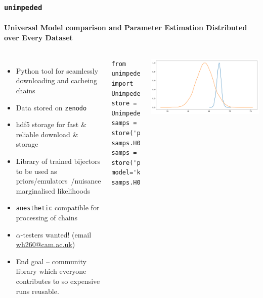 \documentclass[aspectratio=169]{beamer}
\begin{document}
\begin{frame}[fragile]
    \frametitle{\texttt{unimpeded}}
    \framesubtitle{Universal Model comparison and Parameter Estimation Distributed over Every Dataset}
    \begin{columns}
    \begin{itemize}
        \item Python tool for seamlessly downloading and cacheing chains
        \item Data stored on \texttt{zenodo} 
        \item hdf5 storage for fast \& reliable download \& storage
        \item Library of trained bijectors to be used as priors/emulators~/nuisance marginalised likelihoods~
        \item \texttt{anesthetic} compatible for processing of chains~
        \item $\alpha$-testers wanted! (email \href{mailto:wh260@cam.ac.uk}{wh260@cam.ac.uk}) 
        \item End goal -- community library which everyone contributes to so expensive runs reusable.
    \end{itemize}


\lstset{language=Python}
\lstset{frame=lines}
\lstset{basicstyle=\footnotesize}
\begin{lstlisting}
from unimpeded import Unimpeded
store = Unimpeded(cache='data.hdf5')
samps = store('planck')
samps.H0.plot.kde_1d()
samps = store('planck', model='klcdm')
samps.H0.plot.kde_1d()
\end{lstlisting}
\includegraphics[width=\textwidth]{figures/unimpeded.pdf}

        
    \end{columns}
\end{frame}
\end{document}
